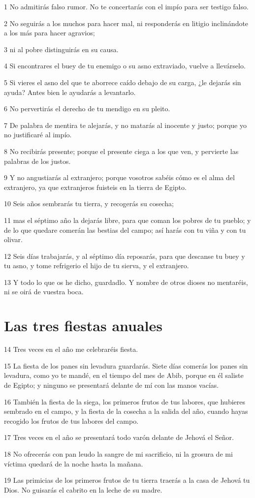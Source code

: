 \par 1 No admitirás falso rumor. No te concertarás con el impío para ser testigo falso.
\par 2 No seguirás a los muchos para hacer mal, ni responderás en litigio inclinándote a los más para hacer agravios;
\par 3 ni al pobre distinguirás en su causa.
\par 4 Si encontrares el buey de tu enemigo o su asno extraviado, vuelve a llevárselo.
\par 5 Si vieres el asno del que te aborrece caído debajo de su carga, ¿le dejarás sin ayuda? Antes bien le ayudarás a levantarlo.
\par 6 No pervertirás el derecho de tu mendigo en su pleito.
\par 7 De palabra de mentira te alejarás, y no matarás al inocente y justo; porque yo no justificaré al impío.
\par 8 No recibirás presente; porque el presente ciega a los que ven, y pervierte las palabras de los justos.
\par 9 Y no angustiarás al extranjero; porque vosotros sabéis cómo es el alma del extranjero, ya que extranjeros fuisteis en la tierra de Egipto.
\par 10 Seis años sembrarás tu tierra, y recogerás su cosecha;
\par 11 mas el séptimo año la dejarás libre, para que coman los pobres de tu pueblo; y de lo que quedare comerán las bestias del campo; así harás con tu viña y con tu olivar.
\par 12 Seis días trabajarás, y al séptimo día reposarás,  para que descanse tu buey y tu asno, y tome refrigerio el hijo de tu sierva, y el extranjero.
\par 13 Y todo lo que os he dicho, guardadlo. Y nombre de otros dioses no mentaréis, ni se oirá de vuestra boca.

\section*{Las tres fiestas anuales}

\par 14 Tres veces en el año me celebraréis fiesta.
\par 15 La fiesta de los panes sin levadura guardarás. Siete días comerás los panes sin levadura, como yo te mandé, en el tiempo del mes de Abib, porque en él saliste de Egipto; y ninguno se presentará delante de mí con las manos vacías.
\par 16 También la fiesta de la siega, los primeros frutos de tus labores, que hubieres sembrado en el campo, y la fiesta de la cosecha a la salida del año, cuando hayas recogido los frutos de tus labores del campo.
\par 17 Tres veces en el año se presentará todo varón delante de Jehová el Señor.
\par 18 No ofrecerás con pan leudo la sangre de mi sacrificio, ni la grosura de mi víctima quedará de la noche hasta la mañana.
\par 19 Las primicias de los primeros frutos de tu tierra traerás a la casa de Jehová tu Dios. No guisarás el cabrito en la leche de su madre.

